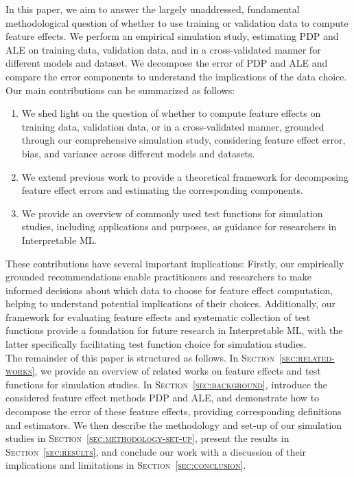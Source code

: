 \documentclass[runningheads]{llncs}
\begin{document}
\noindent In this paper, we aim to answer the largely unaddressed, fundamental
methodological question of whether to use training or validation data to
compute feature effects. We perform an empirical simulation study, estimating
PDP and ALE on training data, validation data, and in a cross-validated manner
for different models and dataset. We decompose the error of PDP and ALE and
compare the error components to understand the implications of the data choice.
Our main contributions can be summarized as follows:

\begin{enumerate}
    \item We shed light on the question of whether to compute feature effects on training
          data, validation data, or in a cross-validated manner, grounded through our
          comprehensive simulation study, considering feature effect error, bias, and
          variance across different models and datasets.
    \item We extend previous work to provide a theoretical framework for decomposing
          feature effect errors and estimating the corresponding components.
    \item We provide an overview of commonly used test functions for simulation studies,
          including applications and purposes, as guidance for researchers in
          Interpretable ML.
\end{enumerate}

\noindent These contributions have several important implications: Firstly, our empirically
grounded recommendations enable practitioners and researchers to make informed
decisions about which data to choose for feature effect computation, helping to
understand potential implications of their choices. Additionally, our framework
for evaluating feature effects and systematic collection of test functions
provide a foundation for future research in Interpretable ML, with the latter
specifically facilitating test function choice for simulation studies.\\

\noindent The remainder of this paper is structured as follows. In
\textsc{Section~\ref{sec:related-works}}, we provide an overview of related
works on feature effects and test functions for simulation studies. In
\textsc{Section~\ref{sec:background}}, introduce the considered feature
effect methods PDP and ALE, and demonstrate how to decompose the error of these
feature effects, providing corresponding definitions and estimators.
We then describe the methodology and set-up of our simulation studies in
\textsc{Section~\ref{sec:methodology-set-up}}, present the results in
\textsc{Section~\ref{sec:results}}, and conclude our work with a discussion 
of their implications and limitations in \textsc{Section~\ref{sec:conclusion}}.
\end{document}
